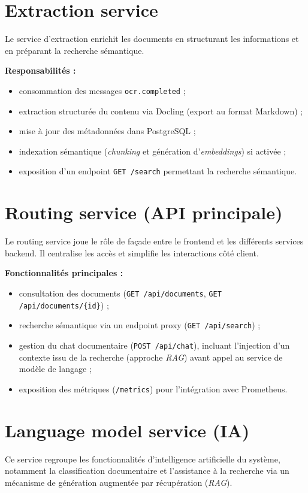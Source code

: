 \documentclass[12pt,a4paper]{report}
\begin{document}
\section{Extraction service}
Le service d’extraction enrichit les documents en structurant les informations et en préparant la recherche sémantique.

\textbf{Responsabilités :}
\begin{itemize}
  \item consommation des messages \texttt{ocr.completed} ;
  \item extraction structurée du contenu via Docling (export au format Markdown) ;
  \item mise à jour des métadonnées dans PostgreSQL ;
  \item indexation sémantique (\textit{chunking} et génération d’\textit{embeddings}) si activée ;
  \item exposition d’un endpoint \texttt{GET /search} permettant la recherche sémantique.
\end{itemize}

\section{Routing service (API principale)}
Le routing service joue le rôle de façade entre le frontend et les différents services backend. Il centralise les accès et simplifie les interactions côté client.

\textbf{Fonctionnalités principales :}
\begin{itemize}
  \item consultation des documents (\texttt{GET /api/documents}, \texttt{GET /api/documents/\{id\}}) ;
  \item recherche sémantique via un endpoint proxy (\texttt{GET /api/search}) ;
  \item gestion du chat documentaire (\texttt{POST /api/chat}), incluant l’injection d’un contexte issu de la recherche (approche \textit{RAG}) avant appel au service de modèle de langage ;
  \item exposition des métriques (\texttt{/metrics}) pour l’intégration avec Prometheus.
\end{itemize}

\section{Language model service (IA)}
Ce service regroupe les fonctionnalités d’intelligence artificielle du système, notamment la classification documentaire et l’assistance à la recherche via un mécanisme de génération augmentée par récupération (\textit{RAG}).
\end{document}
